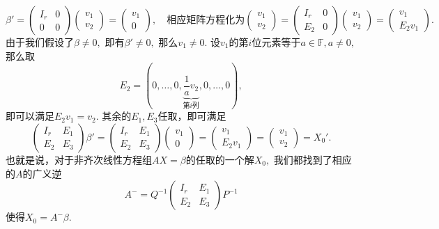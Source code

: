 $$\beta' = \begin{pmatrix} I_r & 0 \\ 0 & 0 \end{pmatrix} \begin{pmatrix} v_1 \\ v_2 \end{pmatrix} = \begin{pmatrix} v_1 \\ 0 \end{pmatrix}, \quad \text{相应矩阵方程化为} \begin{pmatrix} v_1 \\ v_2 \end{pmatrix} = \begin{pmatrix} I_r & 0 \\ E_2 & 0 \end{pmatrix} \begin{pmatrix} v_1 \\ v_2 \end{pmatrix} = \begin{pmatrix} v_1 \\ E_2v_1 \end{pmatrix}.$$
由于我们假设了$\beta \neq 0,$ 即有$\beta' \neq 0,$ 那么$v_1 \neq 0$. 设$v_1$的第$i$位元素等于$a \in \mathbb{F}, a \neq 0,$ 那么取
$$E_2 = (0, \ldots, 0, \underbrace{\dfrac{1}{a}v_2}_{\text{第$i$列}}, 0, \ldots, 0),$$
即可以满足$E_2v_1 = v_2.$ 其余的$E_1, E_3$任取，即可满足
$$\begin{pmatrix} I_r & E_1 \\ E_2 & E_3 \end{pmatrix} \beta' = \begin{pmatrix} I_r & E_1 \\ E_2 & E_3 \end{pmatrix} \begin{pmatrix} v_1 \\ 0 \end{pmatrix} = \begin{pmatrix} v_1 \\ E_2v_1 \end{pmatrix} = \begin{pmatrix} v_1 \\ v_2 \end{pmatrix} = X_0'.$$
也就是说，对于非齐次线性方程组$AX = \beta$的任取的一个解$X_0,$ 我们都找到了相应的$A$的广义逆
$$A^- = Q^{-1} \begin{pmatrix} I_r & E_1 \\ E_2 & E_3 \end{pmatrix} P^{-1}$$
使得$X_0 = A^-\beta.$

